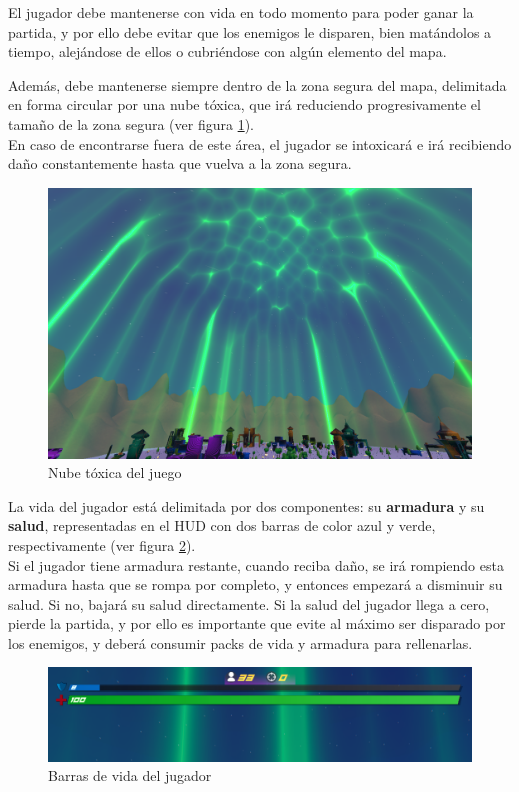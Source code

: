 El jugador debe mantenerse con vida en todo momento para poder ganar la partida, y por ello debe evitar que los enemigos le disparen, bien matándolos a tiempo, alejándose de ellos o cubriéndose con algún elemento del mapa.

Además, debe mantenerse siempre dentro de la zona segura del mapa, delimitada en forma circular por una nube tóxica, que irá reduciendo progresivamente el tamaño de la zona segura (ver figura \ref{fig:NubeToxica}).\\
En caso de encontrarse fuera de este área, el jugador se intoxicará e irá recibiendo daño constantemente hasta que vuelva a la zona segura.

\begin{figure}[h]
    \centering
    \includegraphics[scale=0.45]{img/ToxicCloud.png}
    \caption{Nube tóxica del juego}
    \label{fig:NubeToxica}
    \end{figure}
    
La vida del jugador está delimitada por dos componentes: su \textbf{armadura} y su \textbf{salud}, representadas en el HUD con dos barras de color azul y verde, respectivamente (ver figura \ref{fig:BarrasVida}).\\
Si el jugador tiene armadura restante, cuando reciba daño, se irá rompiendo esta armadura hasta que se rompa por completo, y entonces empezará a disminuir su salud. Si no, bajará su salud directamente.
Si la salud del jugador llega a cero, pierde la partida, y por ello es importante que evite al máximo ser disparado por los enemigos, y deberá consumir packs de vida y armadura para rellenarlas.
\begin{figure}[h]
    \centering
    \includegraphics[scale=0.37]{img/HealthBars.png}
    \caption{Barras de vida del jugador}
    \label{fig:BarrasVida}
    \end{figure}













